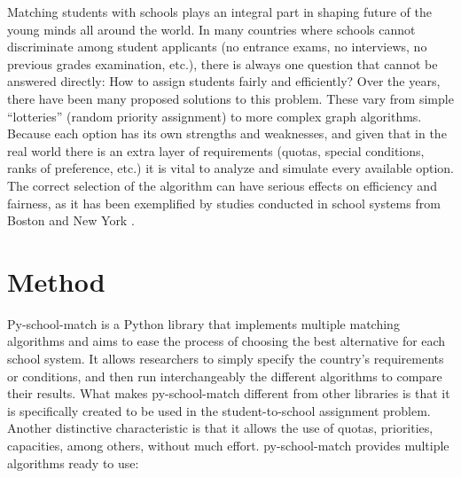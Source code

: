 \documentclass[twocolumn]{bmcart}
\begin{document}
		Matching students with schools plays an integral part in shaping future of the young minds all around the world. In many countries where schools cannot discriminate among student applicants (no entrance exams, no interviews, no previous grades examination, etc.), there is always one
		question that cannot be answered directly: How to assign students fairly and efficiently?
		\vspace{\baselineskip}
		Over the years, there have been many proposed solutions to this problem. These vary from simple “lotteries” (random priority assignment) to more complex graph algorithms. Because each option has its own strengths and weaknesses, and given that in the real world there is an extra layer of requirements (quotas, special conditions, ranks of preference, etc.) it is vital to analyze and simulate every available option. The correct selection of the algorithm can have serious effects on efficiency and fairness, as it has been exemplified by studies conducted in school systems from Boston \cite{sub1} and New York \cite{sub2}.
		
		
		
		\section*{Method}
		\vspace{\baselineskip}
		Py-school-match \cite{article} is a Python library that implements multiple matching algorithms and aims to ease the process of choosing the best alternative for each school system. It allows researchers to simply specify the country’s requirements or conditions, and then run interchangeably the different algorithms to compare their results. What makes py-school-match different from other libraries is that it is specifically created to be used in the student-to-school assignment problem. Another distinctive characteristic is that it allows the use of quotas, priorities, capacities, among others, without much effort. \vspace{\baselineskip}
		py-school-match provides multiple algorithms ready to use: \vspace{\baselineskip}
		
\end{document}
